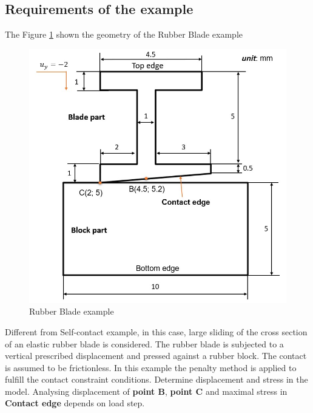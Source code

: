 \subsection{Requirements of the example}
The Figure \ref{fig:model_rubber} shown the geometry of the Rubber Blade example
\begin{figure}[H]
    \centering
    \includegraphics[scale=0.75]{Figures/model_rubber.jpg}
    \decoRule
    \caption{Rubber Blade example}
    \label{fig:model_rubber}
\end{figure}
\noindent
Different from Self-contact example, in this case, large sliding of the cross section of an elastic rubber blade is considered.
The rubber blade is subjected to a vertical prescribed displacement and pressed against a rubber block.
The contact is assumed to be frictionless.
In this example the penalty method is applied to fulfill the contact constraint conditions.
Determine displacement and stress in the model.
Analysing displacement of {\bf point B}, {\bf point C} and maximal stress in {\bf Contact edge} depends on load step.
\newpage
